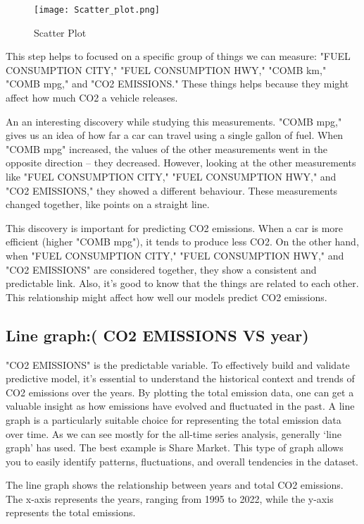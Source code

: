 \documentclass[12pt, a4paper,oneside]{book}
\numberwithin{equation}{section}
\begin{document}
 \begin{figure}[H]
\centerline{\texttt{[image: Scatter\_plot.png]}}
\caption{Scatter Plot}
\label{fig:4.2}
\end{figure}
\newline

 This step helps to focused on a specific group of things we can measure: "FUEL CONSUMPTION CITY," "FUEL CONSUMPTION HWY," "COMB km," "COMB mpg," and "CO2 EMISSIONS." These things helps because they might affect how much CO2 a vehicle releases.

An an interesting discovery while studying this measurements.  "COMB mpg," gives us an idea of how far a car can travel using a single gallon of fuel. When "COMB mpg" increased, the values of the other measurements went in the opposite direction – they decreased. However, looking at the other measurements like "FUEL CONSUMPTION CITY," "FUEL CONSUMPTION HWY," and "CO2 EMISSIONS," they showed a different behaviour. These measurements changed together, like points on a straight line. 

This discovery is important for predicting CO2 emissions. When a car is more efficient (higher "COMB mpg"), it tends to produce less CO2. On the other hand, when "FUEL CONSUMPTION CITY," "FUEL CONSUMPTION HWY," and "CO2 EMISSIONS" are considered together, they show a consistent and predictable link. Also, it's good to know that the things are related to each other. This relationship might affect how well our models predict CO2 emissions. 

\subsection{Line graph:( CO2 EMISSIONS VS year)}

"CO2 EMISSIONS" is the predictable variable. To effectively build and validate predictive model, it's essential to understand the historical context and trends of CO2 emissions over the years. By plotting the total emission data, one can get a valuable insight as how emissions have evolved and fluctuated in the past. 
A line graph is a particularly suitable choice for representing the total emission data over time. As we can see mostly for the all-time series analysis, generally ‘line graph’ has used. The best example is Share Market. This type of graph allows you to easily identify patterns, fluctuations, and overall tendencies in the dataset. 


The line graph shows the relationship between years and total CO2 emissions. The x-axis represents the years, ranging from 1995 to 2022, while the y-axis represents the total emissions.
\end{document}
